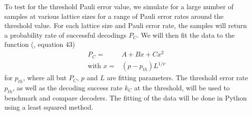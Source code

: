 To test for the threshold Pauli error value, we simulate for a large number of samples at various lattice sizes for a range of Pauli error rates around the threshold value. For each lattice size and Pauli error rate, the samples will return a probability rate of successful decodings $P_{C}$. We will then fit the data to the function (\cite{wang2003confinement}, equation 43)
\begin{align}\label{eq.4.fit}
  \nonumber P_{C} =& A + Bx + Cx^2 \\
  \text{with } x =& (p - p_{th})L^{1/\nu}
\end{align}
for $p_{th}$, where all but $P_{C}$, $p$ and $L$ are fitting parameters. The threshold error rate $p_{th}$, as well as the decoding success rate $k_C$ at the threshold, will be used to benchmark and compare decoders. The fitting of the data will be done in Python using a least squared method. 

